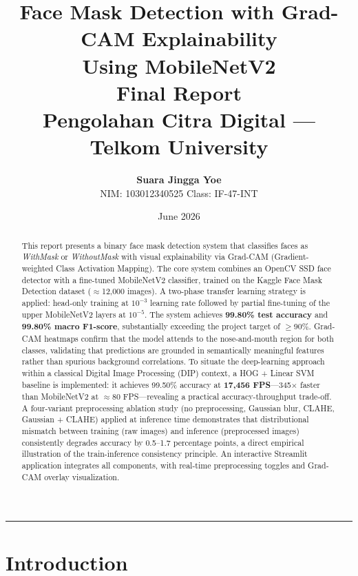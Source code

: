 \documentclass[11pt,a4paper]{article}
\title{
    \vspace{-0.5cm}
    \LARGE\textbf{Face Mask Detection with Grad-CAM Explainability\\Using MobileNetV2}\\[0.6em]
    \large Final Report\\[0.3em]
    \normalsize Pengolahan Citra Digital — Telkom University
}
\author{
    \textbf{Suara Jingga Yoe}\\[0.2em]
    NIM: 103012340525 \quad Class: IF-47-INT
}
\date{June 2026}
\begin{document}
\maketitle
\thispagestyle{fancy}

\begin{abstract}
\noindent
This report presents a binary face mask detection system that classifies faces
as \textit{WithMask} or \textit{WithoutMask} with visual explainability via
Grad-CAM (Gradient-weighted Class Activation Mapping).
The core system combines an OpenCV SSD face detector with a fine-tuned
MobileNetV2 classifier, trained on the Kaggle Face Mask Detection dataset
($\approx$12,000 images).
A two-phase transfer learning strategy is applied: head-only training at
$10^{-3}$ learning rate followed by partial fine-tuning of the upper
MobileNetV2 layers at $10^{-5}$.
The system achieves \textbf{99.80\% test accuracy} and \textbf{99.80\% macro
F1-score}, substantially exceeding the project target of $\geq$90\%.
Grad-CAM heatmaps confirm that the model attends to the nose-and-mouth region
for both classes, validating that predictions are grounded in semantically
meaningful features rather than spurious background correlations.
To situate the deep-learning approach within a classical Digital Image Processing
(DIP) context, a HOG + Linear SVM baseline is implemented:
it achieves 99.50\% accuracy at \textbf{17,456 FPS}---345$\times$ faster than
MobileNetV2 at $\approx$80 FPS---revealing a practical accuracy-throughput
trade-off.
A four-variant preprocessing ablation study (no preprocessing, Gaussian blur,
CLAHE, Gaussian + CLAHE) applied at inference time demonstrates that
distributional mismatch between training (raw images) and inference
(preprocessed images) consistently degrades accuracy by 0.5--1.7 percentage
points, a direct empirical illustration of the train-inference consistency
principle.
An interactive Streamlit application integrates all components, with real-time
preprocessing toggles and Grad-CAM overlay visualization.
\end{abstract}

\vspace{0.5em}
\hrule
\vspace{0.5em}

\section{Introduction}
\end{document}
